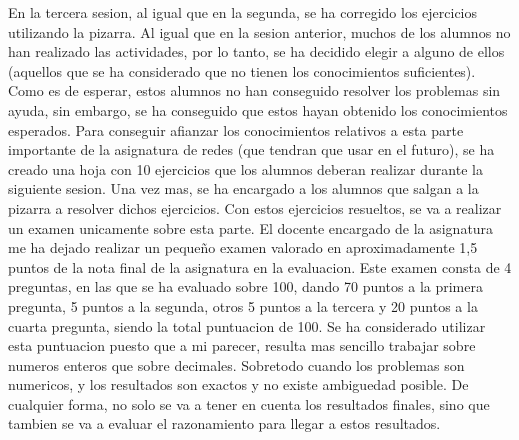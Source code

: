 \documentclass[spanish,12pt, a4paper,twoside]{paper}
\begin{document}
En la tercera sesion, al igual que en la segunda, se ha corregido los ejercicios utilizando la pizarra. Al igual que en la sesion anterior, muchos de los alumnos no han realizado las actividades, por lo tanto, se ha decidido elegir a alguno de ellos (aquellos que se ha considerado que no tienen los conocimientos suficientes). Como es de esperar, estos alumnos no han conseguido resolver los problemas sin ayuda, sin embargo, se ha conseguido que estos hayan obtenido los conocimientos esperados. Para conseguir afianzar los conocimientos relativos a esta parte importante de la asignatura de redes (que tendran que usar en el futuro), se ha creado una hoja con 10 ejercicios que los alumnos deberan realizar durante la siguiente sesion. Una vez mas, se ha encargado a los alumnos que salgan a la pizarra a resolver dichos ejercicios. Con estos ejercicios resueltos, se va a realizar un examen unicamente sobre esta parte.
\justify
El docente encargado de la asignatura me ha dejado realizar un pequeño examen valorado en aproximadamente 1,5 puntos de la nota final de la asignatura en la evaluacion. Este examen consta de 4 preguntas, en las que se ha evaluado sobre 100, dando 70 puntos a la primera pregunta, 5 puntos a la segunda, otros 5 puntos a la tercera y 20 puntos a la cuarta pregunta, siendo la total puntuacion de 100. Se ha considerado utilizar esta puntuacion puesto que a mi parecer, resulta mas sencillo trabajar sobre numeros enteros que sobre decimales. Sobretodo cuando los problemas son numericos, y los resultados son exactos y no existe ambiguedad posible. De cualquier forma, no solo se va a tener en cuenta los resultados finales, sino que tambien se va a evaluar el razonamiento para llegar a estos resultados. 
\end{document}
